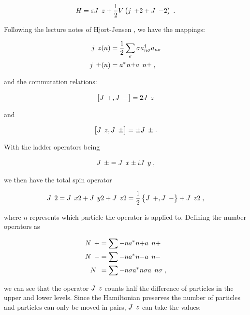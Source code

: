 \begin{equation}
H = \varepsilon \op{J}{z} + \frac{1}{2}V \left ( \op{j}{+}{2}+\op{J}{-}{2} \right ) \; .
\end{equation}


Following the lecture notes of Hjort-Jensen \cite{LipkinQuasiToPauli}, we have the mappings:

\begin{align} \label{eq:mappingJ}
    \op{j}{z}{(n)} &=\frac{1}{2}\sum_{\sigma}\sigma a^\dagger_{n\sigma}a_{n\sigma} \\
    \op{j}{\pm}{(n)}&= \hc{a}{n\pm}\op{a}{n\pm} \; ,
\end{align}

and the commutation relations:

\begin{equation}
    \left [ \op{J}{+}, \op{J}{-} \right ] = 2\op{J}{z}
\end{equation}

and 


\begin{equation}
    \left [ \op{J}{z}, \op{J}{\pm} \right ] = \pm \op{J}{\pm} \; .
\end{equation}

With the ladder operators being

\begin{equation} \label{eq:ladderJ}
    \op{J}{\pm} = \op{J}{x} \pm i\op{J}{y} \; ,
\end{equation}

we then have the total spin operator

\begin{equation}
    \op{J}{}{2} = \op{J}{x}{2} + \op{J}{y}{2} + \op{J}{z}{2} = \frac{1}{2} \left \{ \op{J}{+}, \op{J}{-} \right \} + \op{J}{z}{2} \; ,
\end{equation}

where $n$ represents which particle the operator is applied to. Defining the number operators as

\begin{align}
    \op{N}{+} &= \sum-{n} \hc{a}{n+}\op{a}{n+} \\
    \op{N}{-} &= \sum-{n} \hc{a}{n-}\op{a}{n-} \\
    \op{N} &= \sum-{n\sigma} \hc{a}{n\sigma}\op{a}{n\sigma} \; ,
\end{align}

we can see that the operator $\op{J}{z}$ counts half the difference of particles in the upper and lower levels. Since the Hamiltonian preserves the number of particles and particles can only be moved in pairs, $\op{J}{z}$ can take the values:

